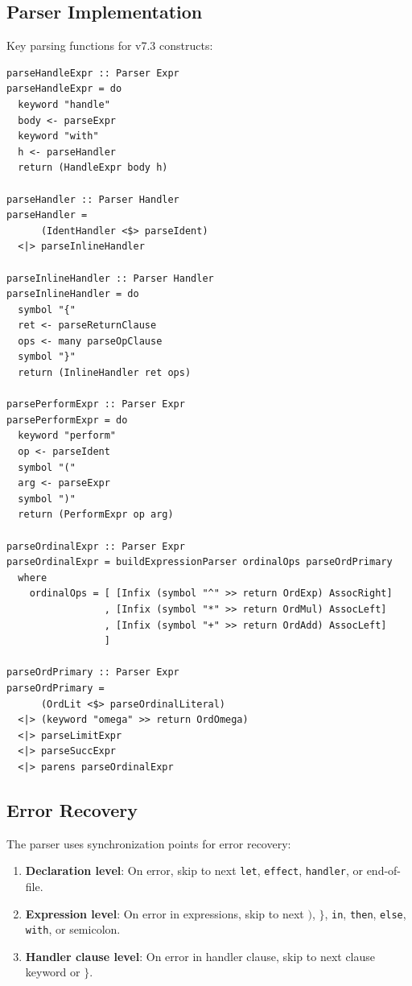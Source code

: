 \subsection{Parser Implementation}
\label{subsec:parser-impl}

\begin{definition}
\label{def:parser-extensions}
Key parsing functions for v7.3 constructs:
\begin{verbatim}
parseHandleExpr :: Parser Expr
parseHandleExpr = do
  keyword "handle"
  body <- parseExpr
  keyword "with"
  h <- parseHandler
  return (HandleExpr body h)

parseHandler :: Parser Handler
parseHandler =
      (IdentHandler <$> parseIdent)
  <|> parseInlineHandler

parseInlineHandler :: Parser Handler
parseInlineHandler = do
  symbol "{"
  ret <- parseReturnClause
  ops <- many parseOpClause
  symbol "}"
  return (InlineHandler ret ops)

parsePerformExpr :: Parser Expr
parsePerformExpr = do
  keyword "perform"
  op <- parseIdent
  symbol "("
  arg <- parseExpr
  symbol ")"
  return (PerformExpr op arg)

parseOrdinalExpr :: Parser Expr
parseOrdinalExpr = buildExpressionParser ordinalOps parseOrdPrimary
  where
    ordinalOps = [ [Infix (symbol "^" >> return OrdExp) AssocRight]
                 , [Infix (symbol "*" >> return OrdMul) AssocLeft]
                 , [Infix (symbol "+" >> return OrdAdd) AssocLeft]
                 ]

parseOrdPrimary :: Parser Expr
parseOrdPrimary =
      (OrdLit <$> parseOrdinalLiteral)
  <|> (keyword "omega" >> return OrdOmega)
  <|> parseLimitExpr
  <|> parseSuccExpr
  <|> parens parseOrdinalExpr
\end{verbatim}
\end{definition}

\subsection{Error Recovery}
\label{subsec:error-recovery}

\begin{definition}
\label{def:sync-points}
The parser uses synchronization points for error recovery:
\begin{enumerate}
  \item \textbf{Declaration level}: On error, skip to next \texttt{let}, \texttt{effect}, \texttt{handler}, or end-of-file.

  \item \textbf{Expression level}: On error in expressions, skip to next $)$, $\}$, \texttt{in}, \texttt{then}, \texttt{else}, \texttt{with}, or semicolon.

  \item \textbf{Handler clause level}: On error in handler clause, skip to next clause keyword or $\}$.
\end{enumerate}
\end{definition}

